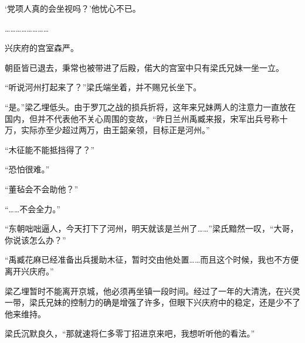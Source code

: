 ‘党项人真的会坐视吗？’他忧心不已。

……………………

兴庆府的宫室森严。

朝臣皆已退去，秉常也被带进了后殿，偌大的宫室中只有梁氏兄妹一坐一立。

“听说河州打起来了？”梁氏端坐着，并不赐兄长坐下。

“是。”梁乙埋低头。由于罗兀之战的损兵折将，这年来兄妹两人的注意力一直放在国内，但并不代表他不关心周围的变故，“昨日兰州禹臧来报，宋军出兵号称十万，实际亦至少超过两万，由王韶亲领，目标正是河州。”

“木征能不能抵挡得了？”

“恐怕很难。”

“董毡会不会助他？”

“……不会全力。”

“东朝咄咄逼人，今天打下了河州，明天就该是兰州了……”梁氏黯然一叹，“大哥，你说该怎么办？”

“禹臧花麻已经准备出兵援助木征，暂时交由他处置……而且这个时候，我也不方便离开兴庆府。”

梁乙埋暂时不能离开京城，他必须再坐镇一段时间。经过了一年的大清洗，在兴灵一带，梁氏兄妹的控制力的确是增强了许多，但眼下兴庆府中的稳定，还是少不了他来维持。

梁氏沉默良久，“那就速将仁多零丁招进京来吧，我想听听他的看法。”


